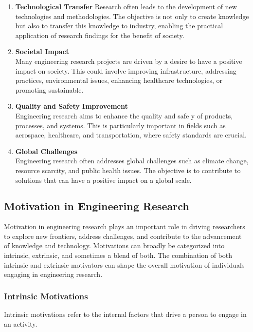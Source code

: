 \documentclass{article}
\begin{document}
\begin{enumerate}[label=\textbf{\roman*)}]
		\item \textbf{Technological Transfer}
		Research often leads to the development of new technologies and methodologies.
		The objective is not only to create knowledge but also to transfer this knowledge to industry, enabling
		the practical application of research findings for the benefit of society.

		\item \textbf{Societal Impact} \\
		Many engineering research projects are driven by a desire to have a positive impact on society.
		This could involve improving infrastructure, addressing practices, environmental issues,
		enhancing healthcare technologies, or promoting sustainable.

		\item \textbf{Quality and Safety Improvement} \\
		Engineering research aims to enhance the quality and safe y of products, processes, and systems.
		This is particularly important in fields such as aerospace, healthcare, and transportation, where
		safety standards are crucial.

		\item \textbf{Global Challenges} \\
		Engineering research often addresses global challenges such as climate change, resource scarcity, and
		public health issues. The objective is to contribute to solutions that can have a positive impact on a
		global scale.
	\end{enumerate}

	\subsection{Motivation in Engineering Research}
	Motivation in engineering research plays an important role in driving researchers to explore new
	frontiers, address challenges, and contribute to the advancement of knowledge and technology.
	Motivations can broadly be categorized into intrinsic, extrinsic, and sometimes a blend of both.
	The combination of both intrinsic and extrinsic motivators can shape the overall motivation of individuals
	engaging in engineering research.

	\subsubsection{Intrinsic Motivations}
	Intrinsic motivations refer to the internal factors that drive a person to engage in an activity.
\end{document}
